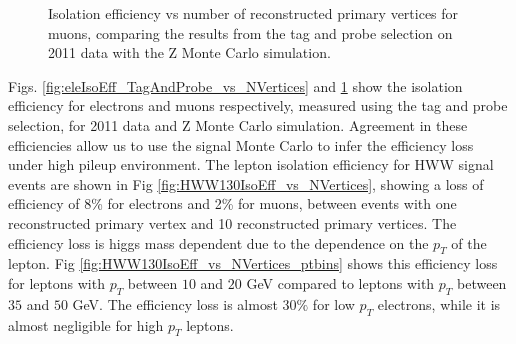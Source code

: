 \begin{figure}[!htbp]
\begin{center}
\caption{Isolation efficiency vs number of reconstructed primary vertices for muons, comparing the 
results from the tag and probe selection on 2011 data with the Z Monte Carlo simulation.}
\label{fig:muIsoEff_TagAndProbe_vs_NVertices}
\end{center}
\end{figure}

Figs. \ref{fig:eleIsoEff_TagAndProbe_vs_NVertices} and \ref{fig:muIsoEff_TagAndProbe_vs_NVertices} 
show the isolation efficiency for electrons and muons respectively, measured using the
tag and probe selection, for 2011 data and Z Monte Carlo simulation. Agreement in these
efficiencies allow us to use the signal Monte Carlo to infer the efficiency loss under 
high pileup environment. The lepton isolation efficiency for HWW signal events are shown
in Fig \ref{fig:HWW130IsoEff_vs_NVertices}, showing a loss of efficiency of 8\% for 
electrons and 2\% for muons, between events with one reconstructed primary vertex
and 10 reconstructed primary vertices. The efficiency loss is higgs mass dependent due to
the dependence on the $p_{T}$ of the lepton. Fig \ref{fig:HWW130IsoEff_vs_NVertices_ptbins}
shows this efficiency loss for leptons with $p_{T}$ between $10$ and $20$ GeV compared
to leptons with $p_{T}$ between $35$ and $50$ GeV. The efficiency loss is almost $30\%$
for low $p_{T}$ electrons, while it is almost negligible for high $p_{T}$ leptons.

